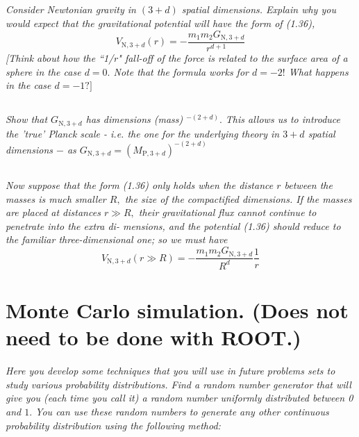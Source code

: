 \documentclass{article}
\begin{document}
\subsection{}
\textit{Consider Newtonian gravity in $(3+d)$ spatial dimensions. Explain why you would expect that the gravitational potential will have the form of (1.36), 
$$
V_{\mathrm{N}, 3+d}(r)=-\frac{m_{1} m_{2} G_{\mathrm{N}, 3+d}}{r^{d+1}}
$$
[Think about how the ``1/r" fall-off of the force is related to the surface area of a sphere in the case $d=0 .$ Note that the formula works for $d=-2 !$ What happens in the case $d=-1 ?]$}

\subsection{}
\textit{Show that $G_{\mathrm{N}, 3+d}$ has dimensions (mass) $^{-(2+d)} .$ This allows us to introduce the 'true' Planck scale - i.e. the one for the underlying theory in $3+d$ spatial dimensions $-$ as $G_{\mathrm{N}, 3+d}=\left(M_{\mathrm{P}, 3+d}\right)^{-(2+d)}$}

\subsection{}
\textit{Now suppose that the form (1.36) only holds when the distance $r$ between the masses is much smaller $R,$ the size of the compactified dimensions. If the masses are placed at distances $r \gg R,$ their gravitational flux cannot continue to penetrate into the extra di- mensions, and the potential (1.36) should reduce to the familiar three-dimensional one; so we must have
$$
V_{\mathrm{N}, 3+d}(r \gg R)=-\frac{m_{1} m_{2} G_{\mathrm{N}, 3+d}}{R^{d}} \frac{1}{r}
$$}


\newpage


\section{Monte Carlo simulation. (Does not need to be done with ROOT.)}
\textit{ Here you develop some techniques that you will use in future problems sets to study various probability distributions. Find a random number generator that will give you (each time you call it) a random number uniformly distributed between 0 and $1 .$ You can use these random numbers to generate any other continuous probability distribution using the following method:}
\end{document}
